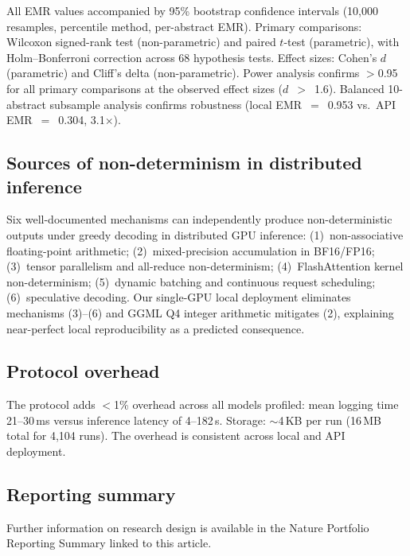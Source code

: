 \documentclass[sn-nature]{sn-jnl}
\begin{document}
All EMR values accompanied by 95\% bootstrap confidence intervals (10,000 resamples, percentile method, per-abstract EMR)\cite{efron1993introduction}.
Primary comparisons: Wilcoxon signed-rank test (non-parametric) and paired $t$-test (parametric), with Holm--Bonferroni correction across 68 hypothesis tests.
Effect sizes: Cohen's $d$ (parametric) and Cliff's delta\cite{romano2006appropriate} (non-parametric).
Power analysis confirms $>$0.95 for all primary comparisons at the observed effect sizes ($d$~$>$~1.6)\cite{cohen1988statistical}.
Balanced 10-abstract subsample analysis confirms robustness (local EMR~$=$~0.953 vs.\ API EMR~$=$~0.304, 3.1$\times$).


\subsection{Sources of non-determinism in distributed inference}\label{subsec:sources}

Six well-documented mechanisms can independently produce non-deterministic outputs under greedy decoding in distributed GPU inference:
(1)~non-associative floating-point arithmetic\cite{higham2002accuracy};
(2)~mixed-precision accumulation in BF16/FP16\cite{yuan2025nondeterminism};
(3)~tensor parallelism and all-reduce non-determinism\cite{shoeybi2019megatron};
(4)~FlashAttention kernel non-determinism\cite{dao2022flashattention};
(5)~dynamic batching and continuous request scheduling\cite{kwon2023vllm};
(6)~speculative decoding\cite{leviathan2023speculative}.
Our single-GPU local deployment eliminates mechanisms (3)--(6) and GGML Q4 integer arithmetic mitigates (2), explaining near-perfect local reproducibility as a predicted consequence.


\subsection{Protocol overhead}\label{subsec:overhead}

The protocol adds $<$1\% overhead across all models profiled: mean logging time 21--30\,ms versus inference latency of 4--182\,s.
Storage: $\sim$4\,KB per run (16\,MB total for 4,104 runs).
The overhead is consistent across local and API deployment.


\subsection{Reporting summary}\label{subsec:reporting}

Further information on research design is available in the Nature Portfolio Reporting Summary linked to this article.
\end{document}
